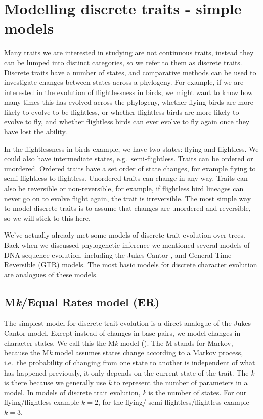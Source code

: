 \documentclass[]{book}
\begin{document}
\section{Modelling discrete traits - simple
models}\label{modelling-discrete-traits---simple-models}

Many traits we are interested in studying are not continuous traits,
instead they can be lumped into distinct categories, so we refer to them
as discrete traits. Discrete traits have a number of states, and
comparative methods can be used to investigate changes between states
across a phylogeny. For example, if we are interested in the evolution
of flightlessness in birds, we might want to know how many times this
has evolved across the phylogeny, whether flying birds are more likely
to evolve to be flightless, or whether flightless birds are more likely
to evolve to fly, and whether flightless birds can ever evolve to fly
again once they have lost the ability.

In the flightlessness in birds example, we have two states: flying and
flightless. We could also have intermediate states,
e.g.~semi-flightless. Traits can be ordered or unordered. Ordered traits
have a set order of state changes, for example flying to semi-flightless
to flightless. Unordered traits can change in any way. Traits can also
be reversible or non-reversible, for example, if flightless bird
lineages can never go on to evolve flight again, the trait is
irreversible. The most simple way to model discrete traits is to assume
that changes are unordered and reversible, so we will stick to this
here.

We've actually already met some models of discrete trait evolution over
trees. Back when we discussed phylogenetic inference we mentioned
several models of DNA sequence evolution, including the Jukes Cantor
\citep{jukes1969evolution}, and General Time Reversible (GTR)
\citep{lanave1984new} models. The most basic models for discrete
character evolution are analogues of these models.

\subsection{\texorpdfstring{M\emph{k}/Equal Rates model
(ER)}{Mk/Equal Rates model (ER)}}\label{mkequal-rates-model-er}

The simplest model for discrete trait evolution is a direct analogue of
the Jukes Cantor model. Except instead of changes in base pairs, we
model changes in character states. We call this the M\emph{k} model
(\citep[\citet{pagel1994detecting}]{lewis2001likelihood}). The M stands
for Markov, because the M\emph{k} model assumes states change according
to a Markov process, i.e.~the probability of changing from one state to
another is independent of what has happened previously, it only depends
on the current state of the trait. The \emph{k} is there because we
generally use \emph{k} to represent the number of parameters in a model.
In models of discrete trait evolution, \emph{k} is the number of states.
For our flying/flightless example \(k = 2\), for the flying/
semi-flightless/flightless example \(k = 3\).
\end{document}
